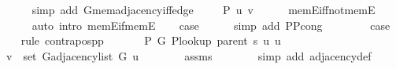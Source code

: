 \begin{isabellebody}
\ \ \ \ \isamarkupfalse%
\ {\isacharparenleft}{\kern0pt}simp\ add{\isacharcolon}{\kern0pt}\ G{}{\isachardot}{\kern0pt}mem{\isacharunderscore}{\kern0pt}adjacency{\isacharunderscore}{\kern0pt}iff{\isacharunderscore}{\kern0pt}edge{\isacharparenright}{\kern0pt}\isanewline
\ \ \isamarkupfalse%
\ {\isachardoublequoteopen}{\isasymnot}\ P{\isacharprime}{\kern0pt}{\isacharprime}{\kern0pt}\ {\isacharbraceleft}{\kern0pt}u{\isacharcomma}{\kern0pt}\ v{\isacharbraceright}{\kern0pt}{\isachardoublequoteclose}\isanewline
\ \ \ \ \isamarkupfalse%
\ mem{\isacharunderscore}{\kern0pt}E{}{\isacharunderscore}{\kern0pt}iff{\isacharunderscore}{\kern0pt}not{\isacharunderscore}{\kern0pt}mem{\isacharunderscore}{\kern0pt}E{}\isanewline
\ \ \ \ \isamarkupfalse%
\ {\isacharparenleft}{\kern0pt}auto\ intro{\isacharcolon}{\kern0pt}\ mem{\isacharunderscore}{\kern0pt}E{\isacharunderscore}{\kern0pt}if{\isacharunderscore}{\kern0pt}mem{\isacharunderscore}{\kern0pt}E{}{\isacharparenright}{\kern0pt}\isanewline
\ \ \isamarkupfalse%
\ {\isacharquery}{\kern0pt}case\isanewline
\ \ \ \ \isamarkupfalse%
\ {\isacharparenleft}{\kern0pt}simp\ add{\isacharcolon}{\kern0pt}\ P{\isacharunderscore}{\kern0pt}P{\isacharprime}{\kern0pt}{\isacharprime}{\kern0pt}{\isacharunderscore}{\kern0pt}cong{\isacharparenright}{\kern0pt}\isanewline
{}\isamarkupfalse%
\isanewline
\ \ \isamarkupfalse%
\ {}\isanewline
\ \ \isamarkupfalse%
\ {\isacharquery}{\kern0pt}case\isanewline
\ \ \isamarkupfalse%
\ {\isacharparenleft}{\kern0pt}rule\ contrapos{\isacharunderscore}{\kern0pt}pp{\isacharparenright}{\kern0pt}\isanewline
\ \ \ \ \isamarkupfalse%
\ {\isachardoublequoteopen}{\isasymnot}\ P{\isacharprime}{\kern0pt}\ G{}\ {\isacharparenleft}{\kern0pt}P{\isacharunderscore}{\kern0pt}lookup\ {\isacharparenleft}{\kern0pt}parent\ s{\isacharparenright}{\kern0pt}\ u{\isacharparenright}{\kern0pt}\ u{\isachardoublequoteclose}\isanewline
\ \ \ \ \isamarkupfalse%
\ {\isachardoublequoteopen}v\ {\isasymin}\ set\ {\isacharparenleft}{\kern0pt}G{\isachardot}{\kern0pt}adjacency{\isacharunderscore}{\kern0pt}list\ G{}\ u{\isacharparenright}{\kern0pt}{\isachardoublequoteclose}\isanewline
\ \ \ \ \ \ \isamarkupfalse%
\ assms\isanewline
\ \ \ \ \ \ \isamarkupfalse%
\ {\isacharparenleft}{\kern0pt}simp\ add{\isacharcolon}{\kern0pt}\ adjacency{\isacharunderscore}{\kern0pt}def{\isacharparenright}{\kern0pt}\isanewline

\end{isabellebody}
